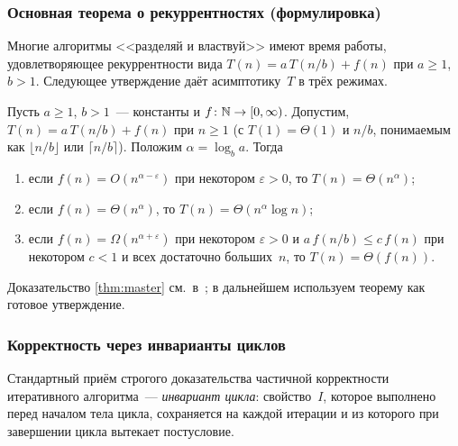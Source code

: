 \subsubsection*{Основная теорема о рекуррентностях (формулировка)}

Многие алгоритмы <<разделяй и властвуй>> имеют время работы,
удовлетворяющее рекуррентности вида $T(n) = a\, T(n/b) + f(n)$ при
$a \geq 1$, $b > 1$. Следующее утверждение даёт асимптотику~$T$ в трёх
режимах.

\begin{theorem}
\label{thm:master}
Пусть $a \geq 1$, $b > 1$~--- константы и $f \colon \mathbb{N} \to [0, \infty)$.
Допустим, $T(n) = a\, T(n/b) + f(n)$ при $n \geq 1$ (с $T(1) = \Theta(1)$
и $n/b$, понимаемым как $\lfloor n/b \rfloor$ или $\lceil n/b \rceil$).
Положим $\alpha = \log_b a$. Тогда
\begin{enumerate}[label=(\alph*)]
  \item если $f(n) = O(n^{\alpha - \varepsilon})$ при некотором $\varepsilon > 0$,
        то $T(n) = \Theta(n^\alpha)$;
  \item если $f(n) = \Theta(n^\alpha)$,
        то $T(n) = \Theta(n^\alpha \log n)$;
  \item если $f(n) = \Omega(n^{\alpha + \varepsilon})$ при некотором $\varepsilon > 0$
        и $a\, f(n/b) \leq c\, f(n)$ при некотором $c < 1$ и всех
        достаточно больших~$n$, то $T(n) = \Theta(f(n))$.
\end{enumerate}
\end{theorem}

Доказательство \cref{thm:master} см.\ в~\cite[гл.~4]{CLRS2013}; в
дальнейшем используем теорему как готовое утверждение.

\subsubsection*{Корректность через инварианты циклов}

Стандартный приём строгого доказательства частичной корректности
итеративного алгоритма~--- \emph{инвариант цикла}: свойство~$I$,
которое выполнено перед началом тела цикла, сохраняется на каждой
итерации и из которого при завершении цикла вытекает постусловие.

